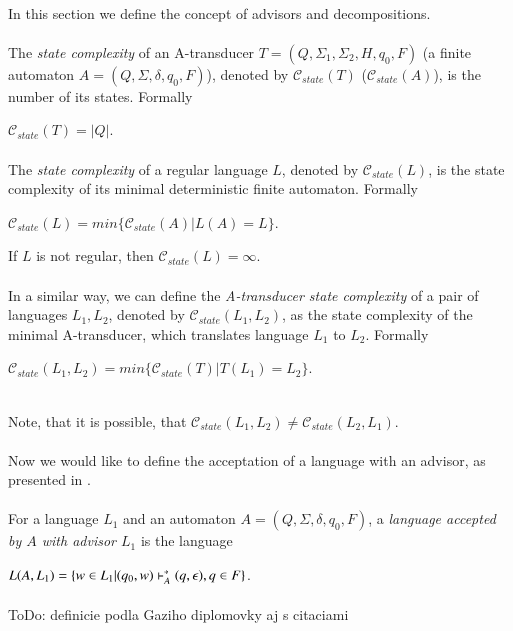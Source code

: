 \paragraph{}
In this section we define the concept of advisors and decompositions.

\paragraph{}
 The \emph{state complexity} of an A-transducer $T = (Q, \Sigma_1, \Sigma_2, H, q_0, F)$ (a finite automaton $A = (Q, \Sigma, \delta, q_0, F)$), denoted by $\mathscr{C}_{state}(T)$ ($\mathscr{C}_{state}(A)$), is the number of its states. Formally \\
\centerline{$\mathscr{C}_{state}(T) = |Q|$.}

\paragraph{}
 The \emph{state complexity} of a regular language $L$, denoted by $\mathscr{C}_{state}(L)$, is the state complexity of its minimal deterministic finite automaton. Formally \\
\centerline{$\mathscr{C}_{state}(L) = min\{ \mathscr{C}_{state}(A)|L(A) = L\} $.}

If $L$ is not regular, then $\mathscr{C}_{state}(L) = \infty $.

\paragraph{}
 In a similar way, we can define the \emph{A-transducer state complexity} of a pair of languages $L_1, L_2$, denoted by $\mathscr{C}_{state}(L_1,L_2)$, as the state complexity of the minimal A-transducer, which translates language $L_1$ to $L_2$. Formally \\
\centerline{$\mathscr{C}_{state}(L_1, L_2) = min\{ \mathscr{C}_{state}(T)|T(L_1) = L_2\} $.} \\
Note, that it is possible, that $\mathscr{C}_{state}(L_1,L_2) \neq \mathscr{C}_{state}(L_2,L_1)$.

\paragraph{}
Now we would like to define the acceptation of a language with an advisor, as presented in \cite{Gazi}.

\paragraph{}
 For a language $L_1$ and an automaton $A = (Q, \Sigma, \delta, q_0, F)$, a \emph{language accepted by $A$ with advisor $L_1$} is the language \\
\centerline{$L(A, L_1) = \{ w \in L_1 | (q_0, w) \vdash^\ast_A (q, \epsilon), q \in F \}$.}
 
\paragraph{}
ToDo: definicie podla Gaziho diplomovky aj s citaciami

\paragraph{}
